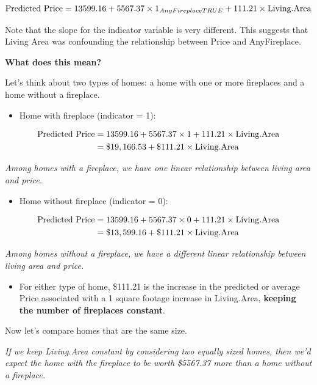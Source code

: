 \documentclass[]{book}
\providecommand{\tightlist}{%
  \setlength{\itemsep}{0pt}\setlength{\parskip}{0pt}}
\begin{document}
\[ \hbox{Predicted Price} = 13599.16 + 5567.37 \times 1_{AnyFireplaceTRUE} + 111.21 \times \hbox{Living.Area} \]

Note that the slope for the indicator variable is very different. This suggests that Living Area was confounding the relationship between Price and AnyFireplace.

\textbf{What does this mean?}

Let's think about two types of homes: a home with one or more fireplaces and a home without a fireplace.

\begin{itemize}
\tightlist
\item
  Home with fireplace (indicator = 1):
\end{itemize}

\begin{align*}
\hbox{Predicted Price} &= 13599.16 + 5567.37 \times 1 + 111.21 \times \hbox{Living.Area} \\
&= \$19,166.53 + \$111.21 \times \hbox{Living.Area}
\end{align*}

\emph{Among homes with a fireplace, we have one linear relationship between living area and price.}

\begin{itemize}
\tightlist
\item
  Home without fireplace (indicator = 0):
\end{itemize}

\begin{align*}
\hbox{Predicted Price} &= 13599.16 + 5567.37 \times 0 + 111.21 \times \hbox{Living.Area} \\
&= \$13,599.16 + \$111.21 \times \hbox{Living.Area}
\end{align*}

\emph{Among homes without a fireplace, we have a different linear relationship between living area and price.}

\begin{itemize}
\tightlist
\item
  For either type of home, \$111.21 is the increase in the predicted or average Price associated with a 1 square footage increase in Living.Area, \textbf{keeping the number of fireplaces constant}.
\end{itemize}

Now let's compare homes that are the same size.

\emph{If we keep Living.Area constant by considering two equally sized homes, then we'd expect the home with the fireplace to be worth \$5567.37 more than a home without a fireplace.}
\end{document}
